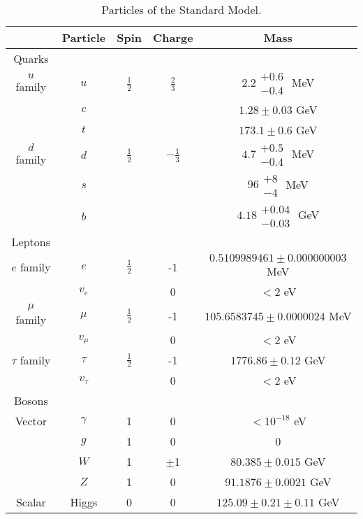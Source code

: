 \begin{table}[!htb]
	\centering
	\caption{Particles of the Standard Model\cite{pdg}.}
	\begin{tabular}{c||c|c|c|c|}
		\hline 
			&	Particle	&	Spin		&	Charge	&	Mass \\
		\hline \hline
		Quarks	&	&	&	&	\\
		\hline
		$u$ family	&	$u$	&	$\frac{1}{2}$	&	$\frac{2}{3}$	&	$2.2\substack{+0.6 \\ -0.4}$ MeV \\
				&	$c$	&		&		&	$1.28 \pm 0.03$ GeV \\
				&	$t$	&		&		&	$173.1 \pm 0.6$ GeV \\

		$d$ family	&	$d$	&	$\frac{1}{2}$	&	$-\frac{1}{3}$	&	$4.7\substack{+0.5 \\ -0.4}$ MeV \\
				&	$s$	&		&		&	$96\substack{+8 \\ -4}$ MeV \\
				&	$b$	&		&		&	$4.18\substack{+0.04 \\ -0.03}$ GeV \\
		\hline		
		Leptons 	&	&	&	&	\\
		\hline
		$e$ family	&	$e$	&	$\frac{1}{2}$	&	-1	&	$0.5109989461 \pm 0.000000003$ MeV \\
				&	$v_{e}$	&		&	0	&	$<2$ eV \\
		$\mu$ family	&	$\mu$	&	$\frac{1}{2}$	&	-1	&	$105.6583745 \pm 0.0000024$ MeV \\
				&	$v_{\mu}$	&		&	0	&	$<2$ eV \\	
		$\tau$ family	&	$\tau$	&	$\frac{1}{2}$	&	-1	&	$1776.86 \pm 0.12$ GeV \\
				&	$v_{\tau}$	&		&	0	&	$<2$ eV \\	
		\hline
		Bosons 	&	&	&	&	\\
		\hline
		Vector 	&	$\gamma$	&	1	&	0	&	$<10^{-18}$ eV\\
				&	$g$			&	1	&	0	&	0 \\
				&	$W$		&	1	&	$\pm$1	&	$80.385 \pm 0.015$ GeV \\
				&	$Z$		&	1	&	0		&	$91.1876 \pm 0.0021$ GeV \\
		Scalar	&	Higgs	&	0	&	0		&	$125.09 \pm 0.21 \pm 0.11$ GeV \\
		\hline \hline			
	\end{tabular}
	\label{tab:SMparticles}
\end{table}		



